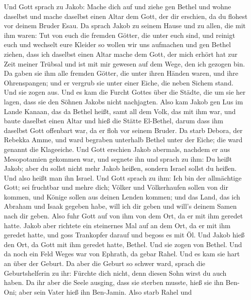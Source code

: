  Und Gott sprach zu Jakob: Mache dich auf und ziehe gen
Bethel und wohne daselbst und mache daselbst einen Altar dem Gott, der
dir erschien, da du flohest vor deinem Bruder Esau.  Da
sprach Jakob zu seinem Hause und zu allen, die mit ihm waren: Tut von
euch die fremden Götter, die unter euch sind, und reinigt euch und
wechselt eure Kleider  so wollen wir uns aufmachen und gen
Bethel ziehen, dass ich daselbst einen Altar mache dem Gott, der mich
erhört hat zur Zeit meiner Trübsal und ist mit mir gewesen auf dem Wege,
den ich gezogen bin.  Da gaben sie ihm alle fremden
Götter, die unter ihren Händen waren, und ihre Ohrenspangen; und er
vergrub sie unter einer Eiche, die neben Sichem stand. 
Und sie zogen aus. Und es kam die Furcht Gottes über die Städte, die um
sie her lagen, dass sie den Söhnen Jakobs nicht nachjagten.
 Also kam Jakob gen Lus im Lande Kanaan, das da Bethel
heißt, samt all dem Volk, das mit ihm war,  und baute
daselbst einen Altar und hieß die Stätte El-Bethel, darum dass ihm
daselbst Gott offenbart war, da er floh vor seinem Bruder.
 Da starb Debora, der Rebekka Amme, und ward begraben
unterhalb Bethel unter der Eiche; die ward genannt die Klageeiche.
 Und Gott erschien Jakob abermals, nachdem er aus
Mesopotamien gekommen war, und segnete ihn  und sprach zu
ihm: Du heißt Jakob; aber du sollst nicht mehr Jakob heißen, sondern
Israel sollst du heißen. Und also heißt man ihn Israel. 
Und Gott sprach zu ihm: Ich bin der allmächtige Gott; sei fruchtbar und
mehre dich; Völker und Völkerhaufen sollen von dir kommen, und Könige
sollen aus deinen Lenden kommen;  und das Land, das ich
Abraham und Isaak gegeben habe, will ich dir geben und will's deinem
Samen nach dir geben.  Also fuhr Gott auf von ihm von dem
Ort, da er mit ihm geredet hatte.  Jakob aber richtete
ein steinernes Mal auf an dem Ort, da er mit ihm geredet hatte, und goss
Trankopfer darauf und begoss es mit Öl.  Und Jakob hieß
den Ort, da Gott mit ihm geredet hatte, Bethel.  Und sie
zogen von Bethel. Und da noch ein Feld Weges war von Ephrath, da gebar
Rahel.  Und es kam sie hart an über der Geburt. Da aber
die Geburt so schwer ward, sprach die Geburtshelferin zu ihr: Fürchte
dich nicht, denn diesen Sohn wirst du auch haben.  Da ihr
aber die Seele ausging, dass sie sterben musste, hieß sie ihn Ben-Oni;
aber sein Vater hieß ihn Ben-Jamin.  Also starb Rahel und
